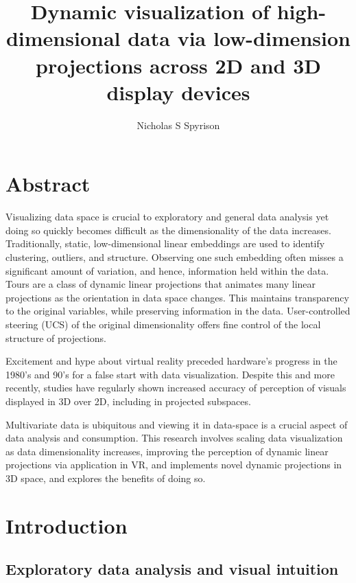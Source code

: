 \documentclass{monashthesis}
\author{Nicholas S Spyrison}
\title{Dynamic visualization of high-dimensional data via low-dimension
projections across 2D and 3D display devices}
\begin{document}

\titlepage

{\sf\tighttoc\doublespacing}

\chapter*{Abstract}\label{abstract}

Visualizing data space is crucial to exploratory and general data
analysis yet doing so quickly becomes difficult as the dimensionality of
the data increases. Traditionally, static, low-dimensional linear
embeddings are used to identify clustering, outliers, and structure.
Observing one such embedding often misses a significant amount of
variation, and hence, information held within the data. Tours are a
class of dynamic linear projections that animates many linear
projections as the orientation in data space changes. This maintains
transparency to the original variables, while preserving information in
the data. User-controlled steering (UCS) of the original dimensionality
offers fine control of the local structure of projections.

Excitement and hype about virtual reality preceded hardware's progress
in the 1980's and 90's for a false start with data visualization.
Despite this and more recently, studies have regularly shown increased
accuracy of perception of visuals displayed in 3D over 2D, including in
projected subspaces.

Multivariate data is ubiquitous and viewing it in data-space is a
crucial aspect of data analysis and consumption. This research involves
scaling data visualization as data dimensionality increases, improving
the perception of dynamic linear projections via application in VR, and
implements novel dynamic projections in 3D space, and explores the
benefits of doing so.

\clearpage{}\setcounter{page}{0}

\chapter{Introduction}\label{ch:introduction}

\section{Exploratory data analysis and visual
intuition}\label{exploratory-data-analysis-and-visual-intuition}
\end{document}
